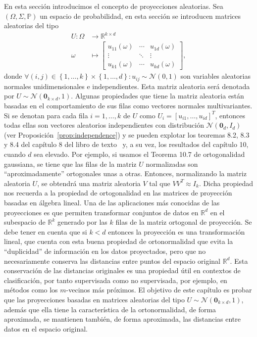 En esta sección introducimos el concepto de proyecciones aleatorias.
Sea $\left(\Omega,\Sigma,\mathbb{P}\right)$ un espacio de
probabilidad, en esta sección se introducen matrices aleatorias del
tipo
\begin{align*}
	U\colon\Omega & \longrightarrow\mathbb{R}^{k\times d} \\
	\omega        & \longmapsto
	\begin{bmatrix}
		u_{11}\left(\omega\right) & \cdots & u_{1d}\left(\omega\right) \\
		\vdots                    & \ddots & \vdots                    \\
		u_{k1}\left(\omega\right) & \cdots & u_{kd}\left(\omega\right)
	\end{bmatrix},
\end{align*}
donde
\begin{math}
	\forall\left(i,j\right)\in
	\left\{1,\dotsc,k\right\}\times\left\{1,\dotsc,d\right\}:
	u_{ij}\sim\mathcal{N}\left(0,1\right)
\end{math}
son variables aleatorias normales unidimensionales e independientes.
Esta matriz aleatoria será denotada por
$U\sim\mathcal{N}\left(\symbf{0}_{k\times d},1\right)$.
Algunas propiedades que tiene la matriz aleatoria están basadas en el
comportamiento de sus filas como vectores normales multivariantes.
Si se denotan para cada fila $i=1,\dotsc,k$ de $U$ como
$U_{i}={\left[u_{i1},\dotsc,u_{id}\right]}^{T}$, entonces todas
ellas son vectores aleatorios independientes con distribución
$\mathcal{N}\left(\symbf{0}_{d},I_{d}\right)$
(ver Proposición~\ref{prop:independence}) y se pueden explotar los
teoremas 8.2, 8.3 y 8.4 del capítulo 8 del libro de
texto~\cite{Wegner2024} y, a su vez, los resultados del capítulo 10,
cuando $d$ sea elevado.
Por ejemplo, si usamos el Teorema 10.7 de ortogonalidad gaussiana, se
tiene que las filas de la matriz $U$ normalizadas son
``aproximadamente'' ortogonales unas a otras.
Entonces, normalizando la matriz aleatoria $U$, se obtendrá una
matriz aleatoria $V$ tal que $VV^{T}≈I_{k}$.
Dicha propiedad nos recuerda a la propiedad de ortogonalidad en las
matrices de proyección basadas en álgebra lineal.
Una de las aplicaciones más conocidas de las proyecciones es que
permiten transformar conjuntos de datos en $\mathbb{R}^{d}$ en el
subespacio de $\mathbb{R}^{k}$ generado por las $k$ filas de la
matriz ortogonal de proyección.
Se debe tener en cuenta que si $k<d$ entonces la proyección es una
transformación lineal, que cuenta con esta buena propiedad de
ortonormalidad que evita la ``duplicidad'' de información en los
datos proyectados, pero que no necesariamente conserva las distancias
entre puntos del espacio original $\mathbb{R}^{d}$.
Esta conservación de las distancias originales es una propiedad útil
en contextos de clasificación, por tanto supervisada como no
supervisada, por ejemplo, en métodos como los $m$-vecinos más
próximos.
El objetivo de este capítulo es probar que las proyecciones basadas
en matrices aleatorias del tipo
$U\sim\mathcal{N}\left(\symbf{0}_{k\times d},1\right)$, además que
ella tiene la característica de la ortonormalidad, de forma
aproximada, se mantienen también, de forma aproximada, las distancias
entre datos en el espacio original.

